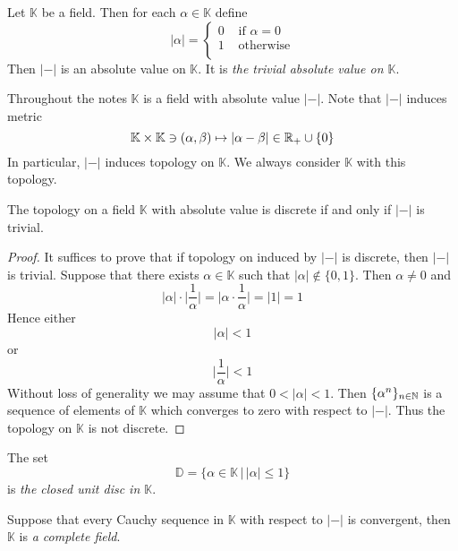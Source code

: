\begin{example}\label{example:trivial_absolute_value}
   Let $\mathbb{K}$ be a field. Then for each $\alpha \in \mathbb{K}$ define
   $$|\alpha| = \begin{cases}
         0 & \mbox{ if }\alpha = 0 \\
         1 & \mbox{ otherwise}     \\
      \end{cases}$$
   Then $|-|$ is an absolute value on $\mathbb{K}$. It is \textit{the trivial absolute value on $\mathbb{K}$}.
\end{example}
\noindent
Throughout the notes $\mathbb{K}$ is a field with absolute value $|-|$. Note that $|-|$ induces metric
$$\mathbb{K}\times \mathbb{K} \ni \left(\alpha, \beta\right) \mapsto |\alpha - \beta|\in {\mathbb R}_+\cup \{0\}$$
In particular, $|-|$ induces topology on $\mathbb{K}$. We always consider $\mathbb{K}$ with this topology.

\begin{fact}\label{fact:trivial_absolute_value_is_the_same_as_discrete_topology}
   The topology on a field $\mathbb{K}$ with absolute value is discrete if and only if $|-|$ is trivial.
\end{fact}
\begin{proof}
   It suffices to prove that if topology on induced by $|-|$ is discrete, then $|-|$ is trivial. Suppose that there exists $\alpha \in \mathbb{K}$ such that $|\alpha| \not \in \{0,1\}$. Then $\alpha \neq 0$ and
   $$|\alpha|\cdot \bigg|\frac{1}{\alpha}\bigg| = \bigg|\alpha \cdot \frac{1}{\alpha}\bigg| = |1| = 1$$
   Hence either
   $$|\alpha| < 1$$
   or
   $$\bigg|\frac{1}{\alpha}\bigg| < 1$$
   Without loss of generality we may assume that $0 < |\alpha| < 1$. Then $\{\alpha^n\}_{n\in {\mathbb N}}$ is a sequence of elements of $\mathbb{K}$ which converges to zero with respect to $|-|$. Thus the topology on $\mathbb{K}$ is not discrete.
\end{proof}

\begin{definition}
   The set
   $$\mathbb{D} = \big\{\alpha \in \mathbb{K}\,\big|\,|\alpha| \leq 1\big\}$$
   is \textit{the closed unit disc in $\mathbb{K}$}.
\end{definition}

\begin{definition}
   Suppose that every Cauchy sequence in $\mathbb{K}$ with respect to $|-|$ is convergent, then $\mathbb{K}$ is \textit{a complete field}.
\end{definition}


